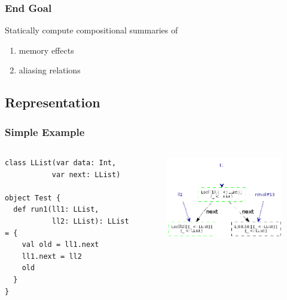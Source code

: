 \documentclass[hyperref={pdfpagelabels=false}]{beamer}
\begin{document}
\begin{frame}
\frametitle{End Goal}
    Statically compute compositional summaries of
    \begin{enumerate}
        \item memory effects
        \item aliasing relations
    \end{enumerate}
\end{frame}

\subsection{Representation}

\begin{frame}[fragile]
\frametitle{Simple Example}

    \begin{columns}
      \begin{column}{0.4\textwidth}
\begin{lstlisting}
class LList(var data: Int,
           var next: LList)

object Test {
  def run1(ll1: LList,
           ll2: LList): LList = {
    val old = ll1.next
    ll1.next = ll2
    old
  }
}
\end{lstlisting}
      \end{column}
      \begin{column}{0.6\textwidth}
        \begin{figure}[t]
            \includegraphics[width=60mm]{images/e1.png}\\
        \end{figure}
      \end{column}
    \end{columns}

\end{frame}
\end{document}
